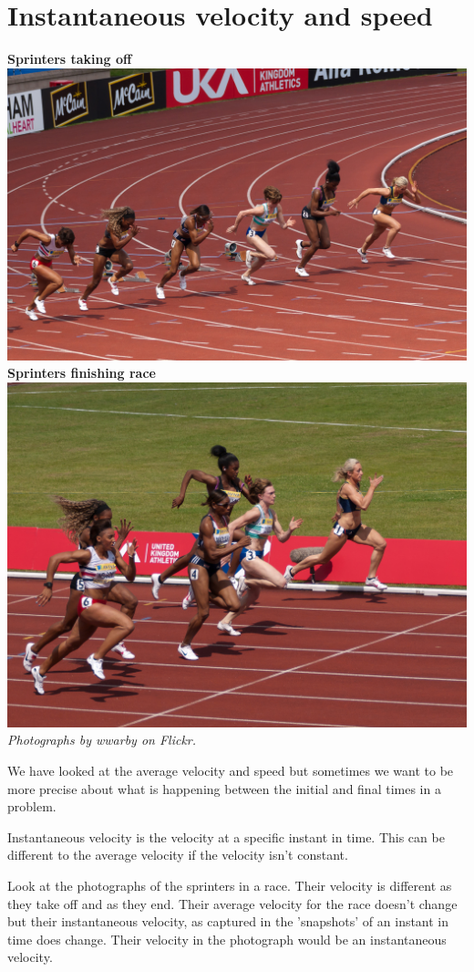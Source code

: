 \section{Instantaneous velocity and speed}


\begin{minipage}{.5\textwidth}
\begin{center}
\textbf{Sprinters taking off}\\
\includegraphics[width=.8\textwidth]{photos/sprintersstarting_wwarby_flickr.jpg}\\
\textbf{Sprinters finishing race}\\
\includegraphics[width=.8\textwidth]{photos/sprintersending_wwarby_flickr.jpg}\\
\textit{Photographs by wwarby on Flickr.}
\end{center}
\end{minipage}
\begin{minipage}{.5\textwidth}

We have looked at the average velocity and speed but sometimes we want to be more precise about what is happening between the initial and final times in a problem.


Instantaneous velocity is the velocity at a specific instant in time. This can be different to the average velocity if the velocity isn't constant.

Look at the photographs of the sprinters in a race. Their velocity is different as they take off and as they end. Their average velocity for the race doesn't change but their instantaneous velocity, as captured in the 'snapshots' of an instant in time does change. Their velocity in the photograph would be an instantaneous velocity.

\end{minipage}

